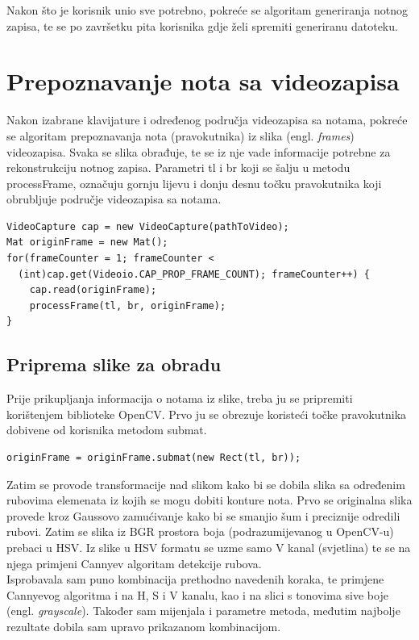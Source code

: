 \documentclass[times, utf8, zavrsni, numeric]{fer}
\begin{document}
Nakon što je korisnik unio sve potrebno, pokreće se algoritam generiranja notnog zapisa, te se po završetku pita korisnika gdje želi spremiti generiranu datoteku.

\section{Prepoznavanje nota sa videozapisa}
Nakon izabrane klavijature i određenog područja videozapisa sa notama, pokreće se algoritam prepoznavanja nota (pravokutnika) iz slika (engl. \textit{frames}) videozapisa. Svaka se slika obrađuje, te se iz nje vade informacije potrebne za rekonstrukciju notnog zapisa. Parametri tl i br koji se šalju u metodu processFrame, označuju gornju lijevu i donju desnu točku pravokutnika koji obrubljuje područje videozapisa sa notama.

\begin{lstlisting}
VideoCapture cap = new VideoCapture(pathToVideo);
Mat originFrame = new Mat();
for(frameCounter = 1; frameCounter <
  (int)cap.get(Videoio.CAP_PROP_FRAME_COUNT); frameCounter++) {
	cap.read(originFrame);
	processFrame(tl, br, originFrame);
}
\end{lstlisting}
\subsection{Priprema slike za obradu}
Prije prikupljanja informacija o notama iz slike, treba ju se pripremiti korištenjem biblioteke OpenCV. Prvo ju se obrezuje koristeći točke pravokutnika dobivene od korisnika metodom submat.

\begin{lstlisting}
originFrame = originFrame.submat(new Rect(tl, br));
\end{lstlisting}

Zatim se provode transformacije nad slikom kako bi se dobila slika sa određenim rubovima elemenata iz kojih se mogu dobiti konture nota. Prvo se originalna slika provede kroz Gaussovo zamućivanje kako bi se smanjio šum i preciznije odredili rubovi. Zatim se slika iz BGR prostora boja (podrazumijevanog u OpenCV-u) prebaci u HSV. Iz slike u HSV formatu se uzme samo V kanal (svjetlina) te se na njega primjeni Cannyev algoritam detekcije rubova.\\

Isprobavala sam puno kombinacija prethodno navedenih koraka, te primjene Cannyevog algoritma i na H, S i V kanalu, kao i na slici s tonovima sive boje (engl. \textit{grayscale}). Također sam mijenjala i parametre metoda, međutim najbolje rezultate dobila sam upravo prikazanom kombinacijom.
\end{document}
